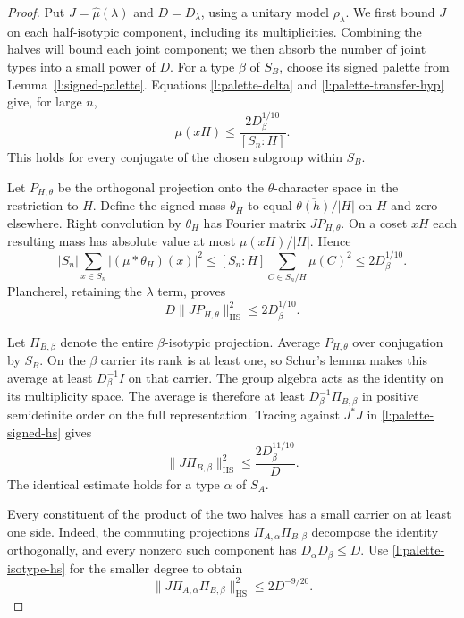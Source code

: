 \begin{proof}
Put $J=\widehat\mu(\lambda)$ and $D=D_\lambda$, using a unitary model
$\rho_\lambda$.  We first bound $J$ on each half-isotypic component,
including its multiplicities.  Combining the halves will bound each
joint component; we then absorb the number of joint types into a small
power of $D$.  For a type $\beta$ of $S_B$, choose its signed
palette from Lemma~\ref{l:signed-palette}.  Equations
\eqref{l:palette-delta} and \eqref{l:palette-transfer-hyp} give,
for large $n$,
\begin{equation}
 \mu(xH)\le\frac{2D_\beta^{1/10}}{[S_n:H]}.
 \label{l:palette-selected-cap}
\end{equation}
This holds for every conjugate of the chosen subgroup within $S_B$.

Let $P_{H,\theta}$ be the orthogonal projection onto the
$\theta$-character space in the restriction to $H$.  Define the signed
mass $\theta_H$ to equal $\overline{\theta(h)}/|H|$ on $H$ and zero
elsewhere.  Right convolution by $\theta_H$ has Fourier
matrix $JP_{H,\theta}$.  On a coset $xH$ each resulting mass has absolute
value at most $\mu(xH)/|H|$.  Hence
\[
 |S_n|\sum_{x\in S_n}|(\mu*\theta_H)(x)|^2
 \le [S_n:H]\sum_{C\in S_n/H}\mu(C)^2
 \le 2D_\beta^{1/10}.
\]
Plancherel, retaining the $\lambda$ term, proves
\begin{equation}
 D\|JP_{H,\theta}\|_{\mathrm{HS}}^2\le2D_\beta^{1/10}.
 \label{l:palette-signed-hs}
\end{equation}

Let $\Pi_{B,\beta}$ denote the entire $\beta$-isotypic projection.
Average $P_{H,\theta}$ over conjugation by $S_B$.
On the $\beta$ carrier its rank is at least one, so Schur's lemma
makes this average at least $D_\beta^{-1}I$ on that carrier.
The group algebra acts as the identity on its multiplicity space.
The average is therefore at least
$D_\beta^{-1}\Pi_{B,\beta}$ in positive semidefinite order on
the full representation.  Tracing against $J^*J$ in
\eqref{l:palette-signed-hs} gives
\begin{equation}
 \|J\Pi_{B,\beta}\|_{\mathrm{HS}}^2
 \le \frac{2D_\beta^{11/10}}{D}.
 \label{l:palette-isotype-hs}
\end{equation}
The identical estimate holds for a type $\alpha$ of $S_A$.

Every constituent of the product of the two halves has a small carrier
on at least one side.  Indeed, the commuting projections
$\Pi_{A,\alpha}\Pi_{B,\beta}$ decompose the identity orthogonally,
and every nonzero such component has $D_\alpha D_\beta\le D$.
Use \eqref{l:palette-isotype-hs} for the smaller degree to obtain
\begin{equation}
 \|J\Pi_{A,\alpha}\Pi_{B,\beta}\|_{\mathrm{HS}}^2
 \le 2D^{-9/20}.
 \label{l:palette-pair-hs}
\end{equation}


\end{proof}
